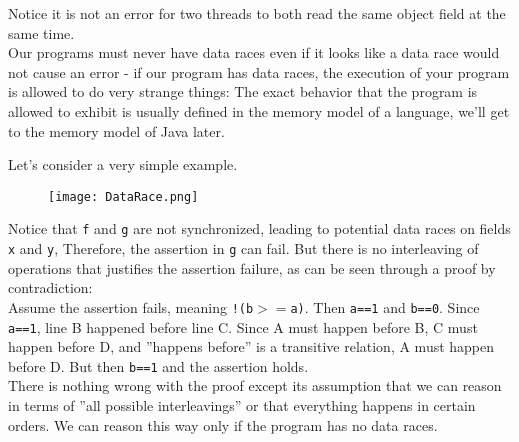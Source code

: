 \documentclass[main]{subfiles}
\begin{document}
\noindent Notice it is not an error for two threads to both read the same object field at the same time.\\[3mm]
Our programs must never have data races even if it looks like a data race would not cause an error - if our program has data races, the execution of your program is allowed to do very strange things: The exact behavior that the program is allowed to exhibit is usually defined in the memory model of a language, we'll get to the memory model of Java later.
\begin{example}
    Let's consider a very simple example.
    \begin{figure}[H]
        \centering
        \texttt{[image: DataRace.png]}
    \end{figure}
    Notice that \texttt{f} and \texttt{g} are not synchronized, leading to potential data races on fields \texttt{x} and \texttt{y}, Therefore, the assertion in \texttt{g} can fail. But there is no interleaving of operations that justifies the assertion failure, as can be seen through a proof by contradiction: \\[3mm]
    \quad Assume the assertion fails, meaning \texttt{!(b$>=$a)}. Then \texttt{a==1} and \texttt{b==0}. Since \texttt{a==1}, line B happened before line C. Since A must happen before B, C must happen before D, and ''happens before'' is a transitive relation, A must happen before D. But then \texttt{b==1} and the assertion holds.\\[3mm]
    There is nothing wrong with the proof except its assumption that we can reason in terms of ''all possible interleavings'' or that everything happens in certain orders. We can reason this way only if the program has no data races.
\end{example}
\end{document}

